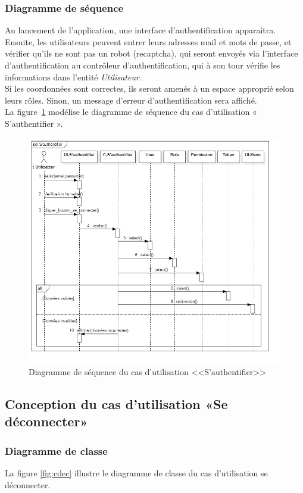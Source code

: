  \subsubsection{Diagramme de séquence}
Au lancement de l'application, une interface d'authentification apparaîtra. Ensuite, les utilisateurs peuvent entrer leurs adresses mail et mots de passe, et vérifier qu'ils ne sont pas un robot (recaptcha), qui seront envoyés via l'interface d'authentification au contrôleur d'authentification, qui à son tour vérifie les informations dans l'entité \textit{Utilisateur}.\\
Si les coordonnées sont correctes, ils seront amenés à un espace approprié selon leurs rôles. Sinon, un message d'erreur d'authentification sera affiché.\\
\noindent La figure~\ref{fig:sauth} modélise le diagramme de séquence du cas d'utilisation « S'authentifier ».
\clearpage
\begin{figure}[h]
     \centering
     \includegraphics[width=18cm]{images/S-S'authentifier.jpg}
     \caption{Diagramme de séquence du cas d'utilisation <<S'authentifier>>}
     \label{fig:sauth}
\end{figure}

\subsection{Conception du cas d'utilisation «Se déconnecter»}
\subsubsection{Diagramme de classe}
La figure \ref{fig:cdec} illustre le diagramme de classe du cas d’utilisation se déconnecter.
\newpage

